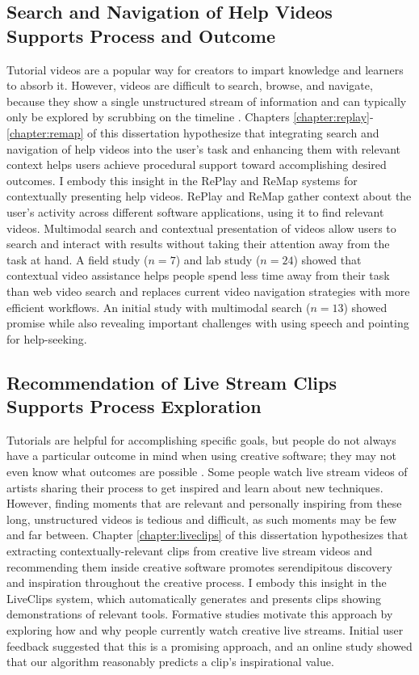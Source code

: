 \subsection{Search and Navigation of Help Videos Supports Process and Outcome}
Tutorial videos are a popular way for creators to impart knowledge and learners to absorb it. However, videos are difficult to search, browse, and navigate, because they show a single unstructured stream of information and can typically only be explored by scrubbing on the timeline \cite{Kim2014, Pavel2015, Pavel2014}. Chapters \ref{chapter:replay}-\ref{chapter:remap} of this dissertation hypothesize that integrating search and navigation of help videos into the user's task and enhancing them with relevant context helps users achieve procedural support toward accomplishing desired outcomes. I embody this insight in the RePlay and ReMap systems for contextually presenting help videos. RePlay and ReMap gather context about the user's activity across different software applications, using it to find relevant videos. Multimodal search and contextual presentation of videos allow users to search and interact with results without taking their attention away from the task at hand. A field study ($n=7$) and lab study ($n=24$) showed that contextual video assistance helps people spend less time away from their task than web video search and replaces current video navigation strategies with more efficient workflows. An initial study with multimodal search ($n=13$) showed promise while also revealing important challenges with using speech and pointing for help-seeking.

\subsection{Recommendation of Live Stream Clips Supports Process Exploration}
Tutorials are helpful for accomplishing specific goals, but people do not always have a particular outcome in mind when using creative software; they may not even know what outcomes are possible \cite{Matejka2009, Chaudhuri2010, ODonovan2015}. Some people watch live stream videos of artists sharing their process to get inspired and learn about new techniques. However, finding moments that are relevant and personally inspiring from these long, unstructured videos is tedious and difficult, as such moments may be few and far between. Chapter \ref{chapter:liveclips} of this dissertation hypothesizes that extracting contextually-relevant clips from creative live stream videos and recommending them inside creative software promotes serendipitous discovery and inspiration throughout the creative process. I embody this insight in the LiveClips system, which automatically generates and presents clips showing demonstrations of relevant tools. Formative studies motivate this approach by exploring how and why people currently watch creative live streams. Initial user feedback suggested that this is a promising approach, and an online study showed that our algorithm reasonably predicts a clip's inspirational value.

